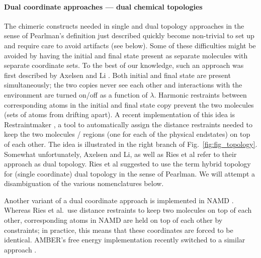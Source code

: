\documentclass[9pt,bestpractices]{livecoms}
\newcommand{\sbnote}[1]{%
  {\bfseries{}[SB: }%
  {\textcolor{blue}{#1}}{\bfseries{}]}
  }
\begin{document}
\paragraph{Dual coordinate approaches --- dual chemical topologies}

The chimeric constructs needed in single and dual topology approaches in the sense of Pearlman’s definition just described quickly become non-trivial to set up and require care to avoid artifacts (see below). %
Some of these difficulties might be avoided by having the initial and final state present as separate molecules with separate coordinate sets. To the best of our knowledge, such an approach was first described by Axelsen and Li \cite{Axelsen_1998}. Both initial and final state are present simultaneously; the two copies never see each other and interactions with the environment are turned on/off as a function of $\lambda$. Harmonic restraints between corresponding atoms in the initial and final state copy prevent the two molecules (sets of atoms from drifting apart). %
A recent implementation of this idea is Restraintmaker \cite{Ries_2022}, a tool to automatically assign the distance restraints needed to keep the two molecules / regions (one for each of the physical endstates) on top of each other. The idea is illustrated in the right branch of Fig.~\ref{fig:fig_topology}.  Somewhat unfortunately, Axelsen and Li, as well as Ries et al refer to their approach as dual topology. Ries et al suggested to use the term hybrid topology for (single coordinate) dual topology in the sense of Pearlman. We will attempt a disambiguation of the various nomenclatures below.

Another variant of a dual coordinate approach is implemented in NAMD \cite{jiang2019computing}. Whereas Ries et al.\  use distance restraints to keep two molecules on top of each other, corresponding atoms in NAMD are held on top of each other by constraints; in practice, this means that these coordinates are forced to be identical. AMBER's free energy implementation recently switched to a similar approach \cite{Lee_2023}.
\end{document}
